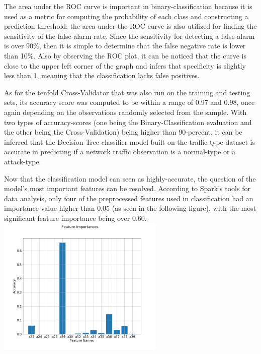 \documentclass[a4paper,12pt]{IEEEtran}
\begin{document}
The area under the ROC curve is important in binary-classification because it is used as a metric for computing the probability of each class and constructing a prediction threshold; the area under the ROC curve is also utilized for finding the sensitivity of the false-alarm rate. Since the sensitivity for detecting a false-alarm is over 90\%, then it is simple to determine that the false negative rate is lower than 10\%. Also by observing the ROC plot, it can be noticed that the curve is close to the upper left corner of the graph and infers that specificity is slightly less than 1, meaning that the classification lacks false positives.

As for the tenfold Cross-Validator that was also run on the training and testing sets, its accuracy score was computed to be within a range of 0.97 and 0.98, once again depending on the observations randomly selected from the sample. With two types of accuracy-scores (one being the Binary-Classification evaluation and the other being the Cross-Validation) being higher than 90-percent, it can be inferred that the Decision Tree classifier model built on the traffic-type dataset is accurate in predicting if a network traffic observation is a normal-type or a attack-type.

Now that the classification model can seen as highly-accurate, the question of the model's most important features can be resolved. According to Spark's tools for data analysis, only four of the preprocessed features used in classification had an importance-value higher than 0.05 (as seen in the following figure), with the most significant feature importance being over 0.60.
\includegraphics[width=8cm]{v1_feature_importances}
\end{document}
